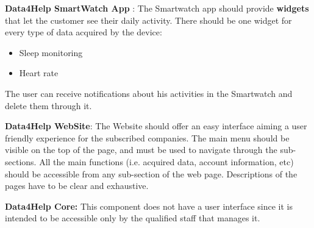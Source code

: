 \textbf{Data4Help SmartWatch App} :
The Smartwatch app should provide \textbf{widgets} that let the customer see their daily activity.
There should be one widget for every type of data acquired by the device:
\begin{itemize}
    \item Sleep monitoring 
    \item Heart rate
\end{itemize}
The user can receive notifications about his activities in the Smartwatch and delete them through it.
\newline

\textbf{Data4Help WebSite}: The Website should offer an easy interface aiming a user friendly experience for the subscribed companies. The main menu should be visible on the top of the page, and must be used to navigate through the sub-sections. All the main functions (i.e. acquired data, account information, etc) should be accessible from any sub-section of the web page. 
Descriptions of the pages have to be clear and exhaustive.
\newline

\textbf{Data4Help Core:} This component does not have a user interface since it is intended to be accessible only by the qualified staff that manages it. 